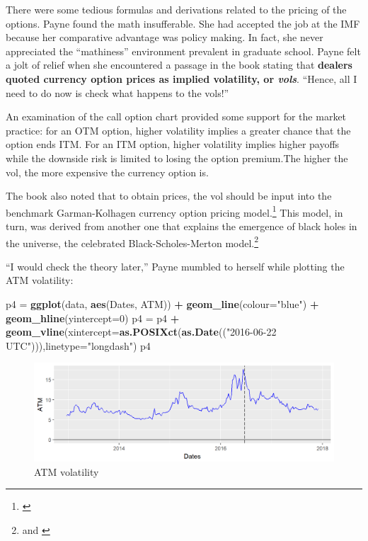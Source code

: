 \documentclass[]{book}
\newenvironment{Shaded}{\begin{snugshade}}{\end{snugshade}}
\newcommand{\KeywordTok}[1]{\textcolor[rgb]{0.13,0.29,0.53}{\textbf{#1}}}
\newcommand{\DataTypeTok}[1]{\textcolor[rgb]{0.13,0.29,0.53}{#1}}
\newcommand{\DecValTok}[1]{\textcolor[rgb]{0.00,0.00,0.81}{#1}}
\newcommand{\StringTok}[1]{\textcolor[rgb]{0.31,0.60,0.02}{#1}}
\newcommand{\OperatorTok}[1]{\textcolor[rgb]{0.81,0.36,0.00}{\textbf{#1}}}
\newcommand{\NormalTok}[1]{#1}
\let\rmarkdownfootnote\footnote%
\def\footnote{\protect\rmarkdownfootnote}
\theoremstyle{definition}
\theoremstyle{definition}
\theoremstyle{definition}
\theoremstyle{remark}
\begin{document}
There were some tedious formulas and derivations related to the pricing
of the options. Payne found the math insufferable. She had accepted the
job at the IMF because her comparative advantage was policy making. In
fact, she never appreciated the ``mathiness'' environment prevalent in
graduate school. Payne felt a jolt of relief when she encountered a
passage in the book stating that \textbf{dealers quoted currency option
prices as implied volatility, or \emph{vols}}. ``Hence, all I need to do
now is check what happens to the vols!''

An examination of the call option chart provided some support for the
market practice: for an OTM option, higher volatility implies a greater
chance that the option ends ITM. For an ITM option, higher volatility
implies higher payoffs while the downside risk is limited to losing the
option premium.The higher the vol, the more expensive the currency
option is.

The book also noted that to obtain prices, the vol should be input into
the benchmark Garman-Kolhagen currency option pricing model.\footnote{\citet{Garman-Kohlhagen1983}}
This model, in turn, was derived from another one that explains the
emergence of black holes in the universe, the celebrated
Black-Scholes-Merton model.\footnote{\citet{Black-Scholes1973} and
  \citet{Merton1973}}

``I would check the theory later,'' Payne mumbled to herself while
plotting the ATM volatility:

\begin{Shaded}
\begin{Highlighting}[]
\NormalTok{p4 =}\StringTok{ }\KeywordTok{ggplot}\NormalTok{(data, }\KeywordTok{aes}\NormalTok{(Dates, ATM)) }\OperatorTok{+}\StringTok{ }\KeywordTok{geom_line}\NormalTok{(}\DataTypeTok{colour=}\StringTok{"blue"}\NormalTok{) }\OperatorTok{+}\StringTok{ }\KeywordTok{geom_hline}\NormalTok{(}\DataTypeTok{yintercept=}\DecValTok{0}\NormalTok{)}
\NormalTok{p4 =}\StringTok{ }\NormalTok{p4 }\OperatorTok{+}\StringTok{ }\KeywordTok{geom_vline}\NormalTok{(}\DataTypeTok{xintercept=}\KeywordTok{as.POSIXct}\NormalTok{(}\KeywordTok{as.Date}\NormalTok{((}\StringTok{"2016-06-22 UTC"}\NormalTok{))),}\DataTypeTok{linetype=}\StringTok{"longdash"}\NormalTok{)}
\NormalTok{p4}
\end{Highlighting}
\end{Shaded}

\begin{figure}
\includegraphics[width=1\linewidth]{images/unnamed-chunk-12-1} \caption{ATM volatility}\label{fig:unnamed-chunk-12}
\end{figure}
\end{document}

